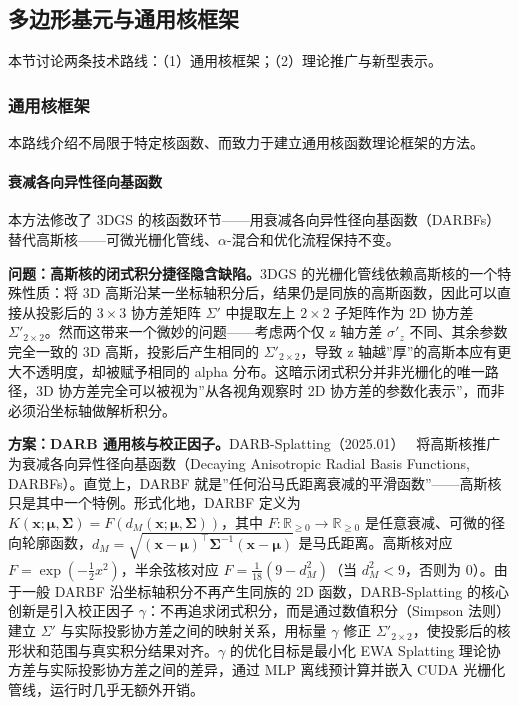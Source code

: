\subsection{多边形基元与通用核框架}
\label{ss:03_4a}

本节讨论两条技术路线：（1）通用核框架；（2）理论推广与新型表示。

\subsubsection{通用核框架}

本路线介绍不局限于特定核函数、而致力于建立通用核函数理论框架的方法。

\paragraph{衰减各向异性径向基函数}

本方法修改了 3DGS 的核函数环节——用衰减各向异性径向基函数（DARBFs）替代高斯核——可微光栅化管线、$\alpha$-混合和优化流程保持不变。

\textbf{问题：高斯核的闭式积分捷径隐含缺陷。}\quad 3DGS 的光栅化管线依赖高斯核的一个特殊性质：将 3D 高斯沿某一坐标轴积分后，结果仍是同族的高斯函数，因此可以直接从投影后的 $3\times3$ 协方差矩阵 $\Sigma'$ 中提取左上 $2\times2$ 子矩阵作为 2D 协方差 $\Sigma'_{2\times2}$。然而这带来一个微妙的问题——考虑两个仅 z 轴方差 $\sigma'_z$ 不同、其余参数完全一致的 3D 高斯，投影后产生相同的 $\Sigma'_{2\times2}$，导致 z 轴越”厚”的高斯本应有更大不透明度，却被赋予相同的 alpha 分布。这暗示闭式积分并非光栅化的唯一路径，3D 协方差完全可以被视为”从各视角观察时 2D 协方差的参数化表示”，而非必须沿坐标轴做解析积分。

\textbf{方案：DARB 通用核与校正因子。}\quad DARB-Splatting（2025.01）~\cite{2501_12369} 将高斯核推广为衰减各向异性径向基函数（Decaying Anisotropic Radial Basis Functions, DARBFs）。直觉上，DARBF 就是”任何沿马氏距离衰减的平滑函数”——高斯核只是其中一个特例。形式化地，DARBF 定义为 $K(\mathbf{x}; \boldsymbol{\mu}, \boldsymbol{\Sigma}) = F(d_M(\mathbf{x}; \boldsymbol{\mu}, \boldsymbol{\Sigma}))$，其中 $F:\mathbb{R}_{\geq0}\to\mathbb{R}_{\geq0}$ 是任意衰减、可微的径向轮廓函数，$d_M = \sqrt{(\mathbf{x}-\boldsymbol{\mu})^\top\boldsymbol{\Sigma}^{-1}(\mathbf{x}-\boldsymbol{\mu})}$ 是马氏距离。高斯核对应 $F=\exp(-\frac{1}{2}x^2)$，半余弦核对应 $F = \frac{1}{18}(9 - d_M^2)$（当 $d_M^2 < 9$，否则为 0）。由于一般 DARBF 沿坐标轴积分不再产生同族的 2D 函数，DARB-Splatting 的核心创新是引入校正因子 $\gamma$：不再追求闭式积分，而是通过数值积分（Simpson 法则）建立 $\Sigma'$ 与实际投影协方差之间的映射关系，用标量 $\gamma$ 修正 $\Sigma'_{2\times2}$，使投影后的核形状和范围与真实积分结果对齐。$\gamma$ 的优化目标是最小化 EWA Splatting 理论协方差与实际投影协方差之间的差异，通过 MLP 离线预计算并嵌入 CUDA 光栅化管线，运行时几乎无额外开销。

